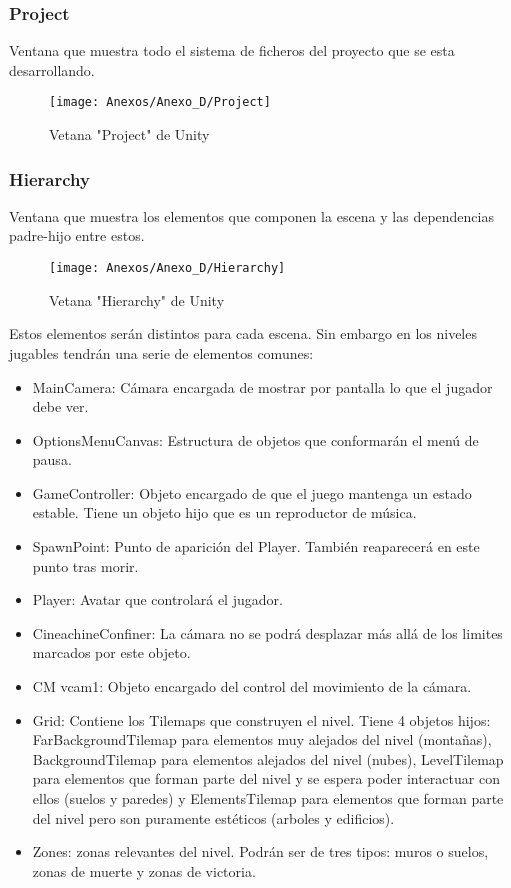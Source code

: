 \subsubsection{Project}
Ventana que muestra todo el sistema de ficheros del proyecto que se esta desarrollando.

\begin{figure}[h]
\centering
\texttt{[image: Anexos/Anexo\_D/Project]}
\caption{Vetana "Project" de Unity}
\end{figure}
\clearpage

\subsubsection{Hierarchy}
Ventana que muestra los elementos que componen la escena y las dependencias padre-hijo entre estos.

\begin{figure}[h]
\centering
\texttt{[image: Anexos/Anexo\_D/Hierarchy]}
\caption{Vetana "Hierarchy" de Unity}
\end{figure}

Estos elementos serán distintos para cada escena. Sin embargo en los niveles jugables tendrán una serie de elementos comunes:
\begin{itemize}
\item
MainCamera: Cámara encargada de mostrar por pantalla lo que el jugador debe ver.
\item
OptionsMenuCanvas: Estructura de objetos que conformarán el menú de pausa.
\item
GameController: Objeto encargado de que el juego mantenga un estado estable. Tiene un objeto hijo que es un reproductor de música.
\item
SpawnPoint: Punto de aparición del Player. También reaparecerá en este punto tras morir.
\item
Player: Avatar que controlará el jugador.
\item
CineachineConfiner: La cámara no se podrá desplazar más allá de los limites marcados por este objeto.
\item
CM vcam1: Objeto encargado del control del movimiento de la cámara.
\item
Grid: Contiene los Tilemaps que construyen el nivel. Tiene 4 objetos hijos: FarBackgroundTilemap para elementos muy alejados del nivel (montañas), BackgroundTilemap para elementos alejados del nivel (nubes), LevelTilemap para elementos que forman parte del nivel y se espera poder interactuar con ellos (suelos y paredes) y ElementsTilemap para elementos que forman parte del nivel pero son puramente estéticos (arboles y edificios).
\item
Zones: zonas relevantes del nivel. Podrán ser de tres tipos: muros o suelos, zonas de muerte y zonas de victoria.
\end{itemize}

